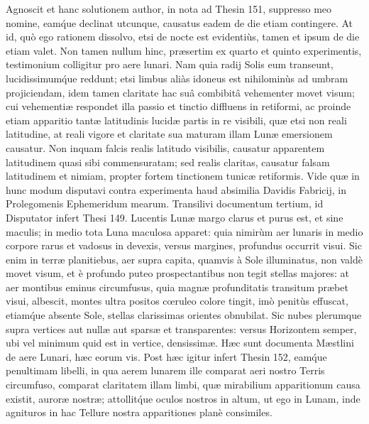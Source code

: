 \documentclass[a4paper, 11pt, oneside, polutonikogreek, german]{article}
\begin{document}
Agnoscit et hanc solutionem author, in nota ad Thesin 151, suppresso meo nomine, eam\'que declinat utcunque, causatus eadem de die etiam contingere. At id, quò ego rationem dissolvo, etsi de nocte est evidentiùs, tamen et ipsum de die etiam valet.\hspace*{5mm}
Non tamen nullum hinc, præsertim ex quarto et quinto experimentis, testimonium colligitur pro aere lunari. Nam quia radij Solis eum transeunt, lucidissimum\'que reddunt; etsi limbus aliàs idoneus est nihilominùs ad umbram projiciendam, idem tamen claritate hac suâ combibitâ vehementer movet visum; cui vehementiæ respondet illa passio et tinctio diffluens in retiformi, ac proinde etiam apparitio tantæ latitudinis lucidæ partis in re visibili, quæ etsi non reali latitudine, at reali vigore et claritate sua maturam illam Lunæ emersionem causatur. Non inquam falcis realis latitudo visibilis, causatur apparentem latitudinem quasi sibi commensuratam; sed realis claritas, causatur falsam latitudinem et nimiam, propter fortem tinctionem tunicæ retiformis. Vide quæ in hunc modum disputavi contra experimenta haud absimilia Davidis Fabricij, in Prolegomenis Ephemeridum mearum.\hspace*{5mm}
Transilivi documentum tertium, id Disputator infert Thesi 149. Lucentis Lunæ margo clarus et purus est, et sine maculis; in medio tota Luna maculosa apparet: quia nimirùm aer lunaris in medio corpore rarus et vadosus in devexis, versus margines, profundus occurrit visui. Sic enim in terræ planitiebus, aer supra capita, quamvis à Sole illuminatus, non valdè movet visum, et è profundo puteo prospectantibus non tegit stellas majores: at aer montibus eminus circumfusus, quia magnæ profunditatis transitum præbet visui, albescit, montes ultra positos cœruleo colore tingit, imò penitùs effuscat, etiam\'que absente Sole, stellas clarissimas orientes obnubilat. Sic nubes plerumque supra vertices aut nullæ aut sparsæ et transparentes: versus Horizontem semper, ubi vel minimum quid est in vertice, densissimæ.\hspace*{5mm}
Hæc sunt documenta Mæstlini de aere Lunari, hæc eorum vis. Post hæc igitur infert Thesin 152, eam\'que penultimam libelli, in qua aerem lunarem ille comparat aeri nostro Terris circumfuso, comparat claritatem illam limbi, quæ mirabilium apparitionum causa existit, auroræ nostræ; attollit\'que oculos nostros in altum, ut ego in Lunam, inde agnituros in hac Tellure nostra apparitiones planè consimiles.\hspace*{5mm}
\end{document}
